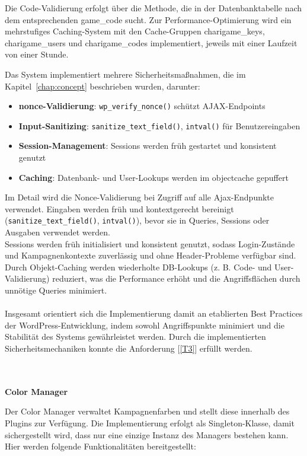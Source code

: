 Die Code-Validierung erfolgt über die  Methode, die in der Datenbanktabelle  nach dem entsprechenden game\_code sucht.
Zur Performance-Optimierung wird ein mehrstufiges Caching-System mit den Cache-Gruppen charigame\_keys, charigame\_users und charigame\_codes implementiert, jeweils mit einer Laufzeit von einer Stunde.

Das System implementiert mehrere Sicherheitsmaßnahmen, die im Kapitel~\ref{chap:concept} beschrieben wurden, darunter:

\begin{itemize}
    \item \textbf{\gls{nonce}-Validierung}: \texttt{wp\_verify\_nonce()} schützt AJAX-Endpoints
    \item \textbf{Input-Sanitizing}: \texttt{sanitize\_text\_field()}, \texttt{intval()} für Benutzereingaben
    \item \textbf{Session-Management}: Sessions werden früh gestartet und konsistent genutzt
    \item \textbf{Caching}: Datenbank- und User-Lookups werden im \gls{objectcache} gepuffert
\end{itemize}

Im Detail wird die Nonce-Validierung bei Zugriff auf alle Ajax-Endpunkte verwendet.
Eingaben werden früh und kontextgerecht bereinigt (\texttt{sanitize\_text\_field()}, \texttt{intval()}), bevor sie in Queries, Sessions oder Ausgaben verwendet werden.\\
Sessions werden früh initialisiert und konsistent genutzt, sodass Login-Zustände und Kampagnenkontexte zuverlässig und ohne Header-Probleme verfügbar sind.\\
Durch Objekt-Caching werden wiederholte DB-Lookups (z. B. Code- und User-Validierung) reduziert, was die Performance erhöht und die Angriffsflächen durch unnötige Queries minimiert.
\\\\
Insgesamt orientiert sich die Implementierung damit an etablierten Best Practices der WordPress-Entwicklung, indem sowohl Angriffspunkte minimiert und die Stabilität des Systems gewährleistet werden.
Durch die implementierten Sicherheitsmechaniken konnte die Anforderung [\ref{T3}] erfüllt werden.

\\\\
\textbf{Color Manager}

Der Color Manager verwaltet Kampagnenfarben und stellt diese innerhalb des Plugins zur Verfügung.
Die Implementierung erfolgt als Singleton-Klasse, damit sichergestellt wird, dass nur eine einzige Instanz des Managers bestehen kann.
Hier werden folgende Funktionalitäten bereitgestellt:

